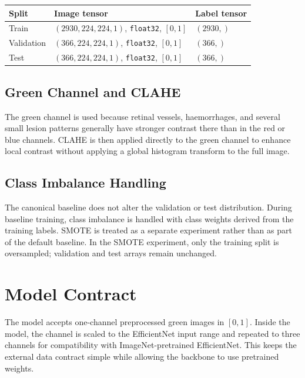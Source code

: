\documentclass[11pt,a4paper]{article}
\begin{document}
\begin{center}
\begin{tabular}{lll}
\toprule
Split & Image tensor & Label tensor \\
\midrule
Train & \((2930, 224, 224, 1)\), \texttt{float32}, \([0,1]\) & \((2930,)\) \\
Validation & \((366, 224, 224, 1)\), \texttt{float32}, \([0,1]\) & \((366,)\) \\
Test & \((366, 224, 224, 1)\), \texttt{float32}, \([0,1]\) & \((366,)\) \\
\bottomrule
\end{tabular}
\end{center}

\subsection{Green Channel and CLAHE}
\label{sec:green-clahe}

The green channel is used because retinal vessels, haemorrhages, and several
small lesion patterns generally have stronger contrast there than in the red
or blue channels. CLAHE is then applied directly to the green channel to
enhance local contrast without applying a global histogram transform to the
full image.

\subsection{Class Imbalance Handling}
\label{sec:imbalance}

The canonical baseline does not alter the validation or test distribution.
During baseline training, class imbalance is handled with class weights derived
from the training labels. SMOTE is treated as a separate experiment rather than
as part of the default baseline. In the SMOTE experiment, only the training
split is oversampled; validation and test arrays remain unchanged.

\section{Model Contract}
\label{sec:model}

The model accepts one-channel preprocessed green images in \([0,1]\). Inside
the model, the channel is scaled to the EfficientNet input range and repeated
to three channels for compatibility with ImageNet-pretrained EfficientNet.
This keeps the external data contract simple while allowing the backbone to use
pretrained weights.
\end{document}

